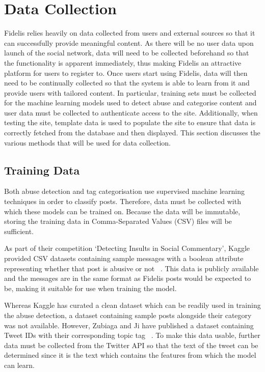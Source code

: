 \section{Data Collection}
Fidelis relies heavily on data collected from users and external sources so that it can successfully provide meaningful content. As there will be no user data upon launch of the social network, data will need to be collected beforehand so that the functionality is apparent immediately, thus making Fidelis an attractive platform for users to register to. Once users start using Fidelis, data will then need to be continually collected so that the system is able to learn from it and provide users with tailored content. In particular, training sets must be collected for the machine learning models used to detect abuse and categorise content and user data must be collected to authenticate access to the site. Additionally, when testing the site, template data is used to populate the site to ensure that data is correctly fetched from the database and then displayed. This section discusses the various methods that will be used for data collection.

\subsection{Training Data}
Both abuse detection and tag categorisation use supervised machine learning techniques in order to classify posts.  Therefore, data must be collected with which these models can be trained on. Because the data will be immutable, storing the training data in Comma-Separated Values (CSV) files will be sufficient.

As part of their competition `Detecting Insults in Social Commentary', Kaggle provided CSV datasets containing sample messages with a boolean attribute representing whether that post is abusive or not ~\cite{Kaggle:Dataset}. This data is publicly available and the messages are in the same format as Fidelis posts would be expected to be, making it suitable for use when training the model.

Whereas Kaggle has curated a clean dataset which can be readily used in training the abuse detection, a dataset containing sample posts alongside their category was not available. However, Zubiaga and Ji have published a dataset containing Tweet IDs with their corresponding topic tag ~\cite{Zubiaga:Tweets}. To make this data usable, further data must be collected from the Twitter API so that the text of the tweet can be determined since it is the text which contains the features from which the model can learn.

